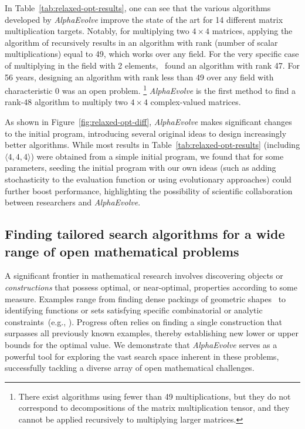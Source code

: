 \documentclass[logo,copyright,12pt]{googledeepmind}
\theoremstyle{definition}
\theoremstyle{remark}
\theoremstyle{plain}
\newcommand{\method}{\emph{AlphaEvolve}\xspace}
\begin{document}
In Table~\ref{tab:relaxed-opt-results}, one can see that the various algorithms developed by \method improve the state of the art for 14 different matrix multiplication targets.
Notably, for multiplying two $4\times 4$ matrices, applying the algorithm of \citet{strassen1969gaussian} recursively results in an algorithm with rank (number of scalar multiplications) equal to 49, which works over any field.
For the very specific case of multiplying in the field with 2 elements,~\citet{fawzi2022discovering} found an algorithm with rank 47.
For 56 years, designing an algorithm with rank less than 49 over any field with characteristic 0 was an open problem.
\footnote{There exist algorithms using fewer than 49 multiplications, but they do not correspond to decompositions of the matrix multiplication tensor, and they cannot be applied recursively to multiplying larger matrices.\vspace{-1em}}
\method is the first method to find a rank-$48$ algorithm to multiply two $4\times 4$ complex-valued matrices.

As shown in Figure~\ref{fig:relaxed-opt-diff}, \method makes significant changes to the initial program, introducing several original ideas to design increasingly better algorithms.
While most results in Table~\ref{tab:relaxed-opt-results} (including $\langle 4, 4, 4 \rangle$) were obtained from a simple initial program, we found that for some parameters, seeding the initial program with our own ideas (such as adding stochasticity to the evaluation function or using evolutionary approaches) could further boost performance, highlighting the possibility of scientific collaboration between researchers and \method. 


\subsection{Finding tailored search algorithms for a wide range of open mathematical problems}
\label{subsec:math}

A significant frontier in mathematical research involves discovering objects or \textit{constructions} that possess optimal, or near-optimal, properties according to some measure. Examples range from finding dense packings of geometric shapes~\cite{geometry_collection} to identifying functions or sets satisfying specific combinatorial or analytic constraints~(e.g., \cite{matolcsi2010improved, vinuesa2010generalized, haugland2016minimum, gyarmati2007sums}). Progress often relies on finding a single construction that surpasses all previously known examples, thereby establishing new lower or upper bounds for the optimal value. We demonstrate that \method serves as a powerful tool for exploring the vast search space inherent in these problems, successfully tackling a diverse array of open mathematical challenges.
\end{document}
